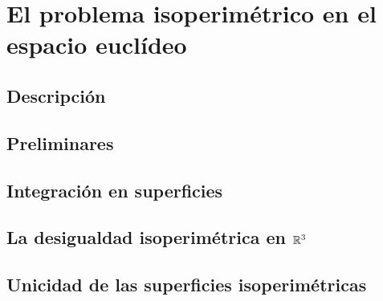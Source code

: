 \documentclass[ oneside,openany,titlepage,numbers=noenddot,headinclude,%
                footinclude=true,cleardoublepage=empty,abstractoff, %
                BCOR=5mm,paper=a4,fontsize=11pt,%
                spanish,american%
                ]{scrreprt}
\begin{document}
\frenchspacing
\raggedbottom
{} %
\pagestyle{plain}
%


\cleardoublepage
\pagestyle{scrheadings}
\cleardoublepage
\cleardoublepage{}
\cleardoublepage

\part{El problema isoperimétrico en el espacio euclídeo}

\chapter{Descripción}




\chapter{Preliminares}


\chapter{Integración en superficies}


\chapter{La desigualdad isoperimétrica en $\mathbb{R}^3$}


\chapter{Unicidad de las superficies isoperimétricas}

\end{document}
